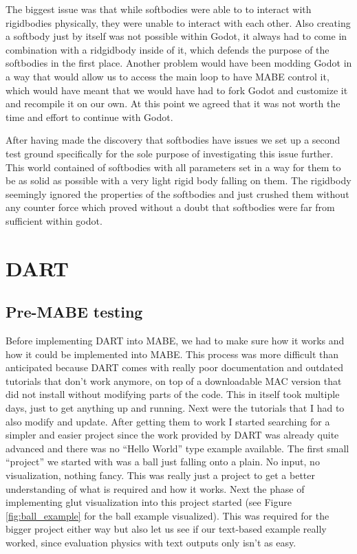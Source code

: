 \documentclass[12pt,oneside,listof=totoc,paper=a4,headings=small]{scrbook}
\begin{document}
The biggest issue was that while softbodies were able to to interact with rigidbodies physically, they were unable to interact with each other. Also creating a softbody just by itself was not possible within Godot, it always had to come in combination with a ridgidbody inside of it, which defends the purpose of the softbodies in the first place. Another problem would have been modding Godot in a way that would allow us to access the main loop to have MABE control it, which would have meant that we would have had to fork Godot and customize it and recompile it on our own.
At this point we agreed that it was not worth the time and effort to continue with Godot.

 After having made the discovery that softbodies have issues we set up a second test ground specifically for the sole purpose of investigating this issue further. This world contained of softbodies with all parameters set in a way for them to be as solid as possible with a very light rigid body falling on them. The rigidbody seemingly ignored the properties of the softbodies and just crushed them without any counter force which proved without a doubt that softbodies were far from sufficient within godot.


\newpage
\section{DART}
\subsection{Pre-MABE testing}
Before implementing DART into MABE, we had to make sure how it works and how it could be implemented into MABE. This process was more difficult than anticipated because DART comes with really poor documentation and outdated tutorials that don't work anymore, on top of a downloadable MAC version that did not install without modifying parts of the code. This in itself took multiple days, just to get anything up and running. Next were the tutorials that I had to also modify and update. After getting them to work I started searching for a simpler and easier project since the work provided by DART was already quite advanced and there was no ``Hello World'' type example available. 
The first small ``project'' we started with was a ball just falling onto a plain. No input, no visualization, nothing fancy. This was really just a project to get a better understanding of what is required and how it works.
Next the phase of implementing glut visualization into this project started (see Figure \ref{fig:ball_example} for the ball example visualized). This was required for the bigger project either way but also let us see if our text-based example really worked, since evaluation physics with text outputs only isn't as easy.
\end{document}
